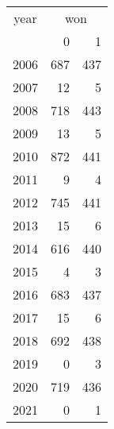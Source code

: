 \footnotesize\begin{tabular}[t]{lrr}
\toprule
\multicolumn{1}{c}{year} & \multicolumn{2}{c}{won} \\
\cmidrule(l{3pt}r{3pt}){1-1} \cmidrule(l{3pt}r{3pt}){2-3}
  & 0 & 1\\
\midrule
2006 & 687 & 437\\
2007 & 12 & 5\\
2008 & 718 & 443\\
2009 & 13 & 5\\
2010 & 872 & 441\\
2011 & 9 & 4\\
2012 & 745 & 441\\
2013 & 15 & 6\\
2014 & 616 & 440\\
2015 & 4 & 3\\
2016 & 683 & 437\\
2017 & 15 & 6\\
2018 & 692 & 438\\
2019 & 0 & 3\\
2020 & 719 & 436\\
2021 & 0 & 1\\
\bottomrule
\end{tabular}

